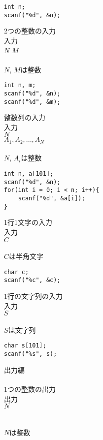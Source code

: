 \noindent
\begin{lstlisting}[style = customC]
int n;
scanf("%d", &n);
\end{lstlisting}

\noindent
{\Large 2つの整数の入力}\\ 
入力\\
$N$ $M$
\\ \\ \noindent
$N$, $M$は整数

\noindent
\begin{lstlisting}[style = customC]
int n, m;
scanf("%d", &n);
scanf("%d", &m);
\end{lstlisting}

\noindent
{\Large 整数列の入力}\\ 
入力\\
$N$\\
$A_1, A_2, ..., A_N$
\\ \\ \noindent
$N$, $A_i$は整数\\

\noindent
\begin{lstlisting}[style = customC]
int n, a[101];
scanf("%d", &n);
for(int i = 0; i < n; i++){
    scanf("%d", &a[i]);
}
\end{lstlisting}

\clearpage
\noindent
{\Large 1行1文字の入力}\\ 
入力\\
$C$
\\ \\ \noindent
$C$は半角文字\\

\noindent
\begin{lstlisting}[style = customC]
char c;
scanf("%c", &c);
\end{lstlisting}

\noindent
{\Large 1行の文字列の入力}\\ 
入力\\
$S$
\\ \\ \noindent
$S$は文字列\\

\noindent
\begin{lstlisting}[style = customC]
char s[101];
scanf("%s", s);
\end{lstlisting}

\noindent
{\LARGE 出力編}\\ \hrulefill \\
{\Large 1つの整数の出力}\\ 
出力\\
$N$\\
\\ \\ \noindent
$N$は整数

